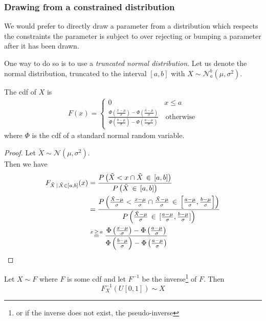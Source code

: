 \subsubsection{Drawing from a constrained distribution}
We would prefer to directly draw a parameter from a distribution which respects the constraints the parameter is subject to over rejecting or bumping a parameter after it has been drawn. 

One way to do so is to use a \textit{truncated normal distribution}.
Let us denote the normal distribution, truncated to the interval $[a, b]$ with $X \sim \mathcal{N}_a^b(\mu, \sigma^2)$. 

\begin{lemma}
	The cdf of $X$ is \\
	\begin{align*}
	F(x) = \begin{cases}
		0	& x \leq  a \\
		\frac{
			\Phi\left( \frac{x - \mu}{\sigma} \right)
			- \Phi\left(\frac{a - \mu}{\sigma}\right)
		}{
		\Phi\left(\frac{b - \mu}{\sigma}\right)
		- \Phi\left(\frac{a - \mu}{\sigma}\right)
		}
	    & \, \text{otherwise}
		\end{cases}
	\end{align*}
	where $\Phi$ is the cdf of a standard normal random variable.
	\label{lem:cdf}
\end{lemma}

\begin{proof}
	Let $\tilde{X} \sim \mathcal{N}(\mu, \sigma^2)$. \\
	Then we have 
	\begin{align*}
		F_{ \tilde{X} \, | \, \tilde{X} \in [a, b]}(x) &= \frac{P \left(\tilde{X} < x \cap \tilde{X} \, \in \, [a, b]\right) }{P \left(\tilde{X} \, \in \, [a, b]\right)} \\
		&= \frac{P \left(\frac{\tilde{X} - \mu }{\sigma} < \frac{x - \mu }{\sigma} \cap \frac{\tilde{X} - \mu }{\sigma} \, \in \, \left[\frac{a - \mu }{\sigma}, \frac{b - \mu }{\sigma} \right]\right) }{P \left(\frac{\tilde{X} - \mu }{\sigma} \, \in \, [\frac{a - \mu }{\sigma}, \frac{b - \mu }{\sigma}]\right)} \\
		&\overset{x \, \geq \, a}{=} \frac{\Phi\left(\frac{x - \mu}{\sigma}\right) - \Phi\left(\frac{a - \mu}{\sigma}\right)}{\Phi\left(\frac{b - \mu}{\sigma}\right) - \Phi\left(\frac{a - \mu}{\sigma}\right)}
	\end{align*}
\end{proof}

\begin{theorem}
Let $X \sim F$ where $F$ is some cdf and let $F^{-1}$ be the inverse\footnote{or if the inverse does not exist, the pseudo-inverse} of $F$. 
Then
\[
F_X^{-1}(U[0, 1]) \sim X
\]
\end{theorem}

